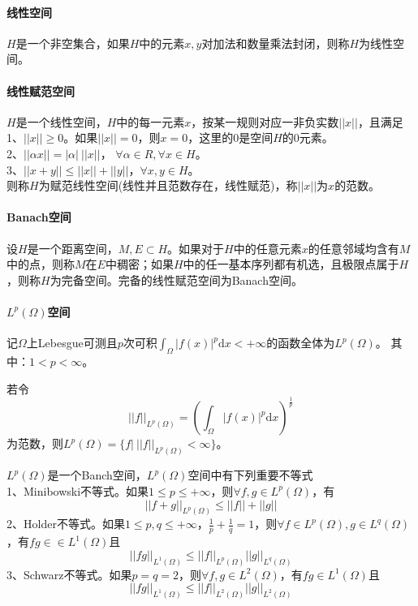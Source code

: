         \paragraph{线性空间}
        $H$是一个非空集合，如果$H$中的元素$x,y$对加法和数量乘法封闭，则称$H$为线性空间。
        \paragraph{线性赋范空间}
        $H$是一个线性空间，$H$中的每一元素$x$，按某一规则对应一非负实数$||x||$，且满足\\
        1、$||x|| \geqslant 0$。如果$||x|| = 0$，则$x = 0$，这里的$0$是空间$H$的$0$元素。\\
        2、$||\alpha x|| = |\alpha|\ ||x||$， $\forall \alpha \in R,\forall x \in H$。\\
        3、$||x +y|| \leqslant ||x||+||y||$，$\forall x,y \in H$。\\
        则称$H$为赋范线性空间(线性并且范数存在，线性赋范)，称$||x||$为$x$的范数。
        \paragraph{Banach空间}
        设$H$是一个距离空间，$M,E \subset H$。如果对于$H$中的任意元素$x$的任意邻域均含有$M$中的点，则称$M$在$E$中稠密；如果$H$中的任一基本序列都有机选，且极限点属于$H$，则称$H$为完备空间。完备的线性赋范空间为Banach空间。
        \paragraph{$L^p(\Omega)$空间}
        记$\Omega$上Lebesgue可测且$p$次可积$\int_{\Omega} |f(x)|^p \mathrm{d}x < +\infty$的函数全体为$L^p(\Omega)$。
        其中：$1<p<\infty$。
        \par
        若令
        \[
            ||f||_{L^p(\Omega)} = \left( \int_{\Omega} |f(x)|^p \mathrm{d}x\right)^{\frac{1}{p}}
        \]
        为范数，则$L^p(\Omega) = \{f|\ ||f||_{L^p(\Omega)} < \infty\}$。
        \par
        $L^p(\Omega)$是一个Banch空间，$L^p(\Omega)$空间中有下列重要不等式\\
        1、Minibowski不等式。如果$1 \leqslant p \leqslant +\infty$，则$\forall f,g \in L^p(\Omega)$，有
        \[
            ||f +g||_{L^p(\Omega)} \leqslant ||f||+||g||
        \]
        2、Holder不等式。如果$1 \leqslant p,q \leqslant +\infty$，$\frac{1}{p} + \frac{1}{q} = 1$，则$\forall f \in L^p(\Omega),g\in L^q(\Omega)$，有$fg \in \in L^1(\Omega)$且
        \[
            ||f g||_{L^1(\Omega)} \leqslant ||f||_{L^p(\Omega)}||g||_{L^q(\Omega)}
        \]
        3、Schwarz不等式。如果$p = q = 2$，则$\forall f,g \in L^2(\Omega)$，有$fg \in L^1(\Omega)$且
        \[
            ||f g||_{L^1(\Omega)} \leqslant ||f||_{L^2(\Omega)}||g||_{L^2(\Omega)}
        \]
